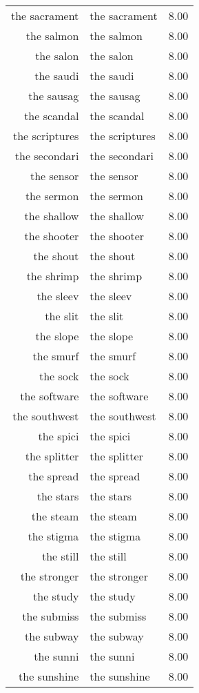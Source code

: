 \begin{table}[ht]
\begin{tabular}{rlr}
  the sacrament & the sacrament & 8.00 \\ 
  the salmon & the salmon & 8.00 \\ 
  the salon & the salon & 8.00 \\ 
  the saudi & the saudi & 8.00 \\ 
  the sausag & the sausag & 8.00 \\ 
  the scandal & the scandal & 8.00 \\ 
  the scriptures & the scriptures & 8.00 \\ 
  the secondari & the secondari & 8.00 \\ 
  the sensor & the sensor & 8.00 \\ 
  the sermon & the sermon & 8.00 \\ 
  the shallow & the shallow & 8.00 \\ 
  the shooter & the shooter & 8.00 \\ 
  the shout & the shout & 8.00 \\ 
  the shrimp & the shrimp & 8.00 \\ 
  the sleev & the sleev & 8.00 \\ 
  the slit & the slit & 8.00 \\ 
  the slope & the slope & 8.00 \\ 
  the smurf & the smurf & 8.00 \\ 
  the sock & the sock & 8.00 \\ 
  the software & the software & 8.00 \\ 
  the southwest & the southwest & 8.00 \\ 
  the spici & the spici & 8.00 \\ 
  the splitter & the splitter & 8.00 \\ 
  the spread & the spread & 8.00 \\ 
  the stars & the stars & 8.00 \\ 
  the steam & the steam & 8.00 \\ 
  the stigma & the stigma & 8.00 \\ 
  the still & the still & 8.00 \\ 
  the stronger & the stronger & 8.00 \\ 
  the study & the study & 8.00 \\ 
  the submiss & the submiss & 8.00 \\ 
  the subway & the subway & 8.00 \\ 
  the sunni & the sunni & 8.00 \\ 
  the sunshine & the sunshine & 8.00 \\ 

\end{tabular}
\end{table}
